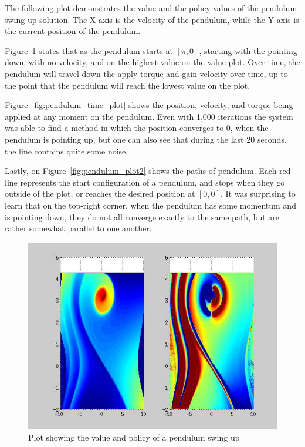 \documentclass[12pt]{report}
\begin{document}
The following plot demonstrates the value and the policy values of the pendulum swing-up solution. The X-axis is the velocity of the pendulum, while the Y-axis is the current position of the pendulum. 

Figure~\ref{fig:pendulum_plot} states that as the pendulum starts at $[\pi, 0]$, starting with the pointing down, with no velocity, and on the highest value on the value plot. Over time, the pendulum will travel down the apply torque and gain velocity over time, up to the point that the pendulum will reach the lowest value on the plot. 

Figure~\ref{fig:pendulum_time_plot} shows the position, velocity, and torque being applied at any moment on the pendulum. Even with 1,000 iterations the system was able to find a method in which the position converges to 0, when the pendulum is pointing up, but one can also see that during the last 20 seconds, the line contains quite some noise.

Lastly, on Figure~\ref{fig:pendulum_plot2} shows the paths of pendulum. Each red line represents the start configuration of a pendulum, and stops when they go outside of the plot, or reaches the desired position at $[0,0]$. It was surprising to learn that on the top-right corner, when the pendulum has some momentum and is pointing down, they do not all converge exactly to the same path, but are rather somewhat parallel to one another.

\begin{figure}
\begin{center}
\includegraphics[scale=0.7]{images/DDP.png}
\caption{Plot showing the value and policy of a pendulum swing up}
\label{fig:pendulum_plot}
\end{center}
\end{figure}
\end{document}
